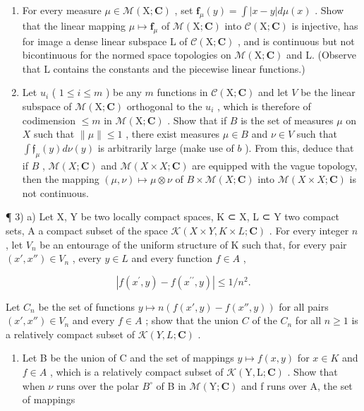 \begin{enumerate}
\def\labelenumi{\alph{enumi})}
\setcounter{enumi}{1}
\item
  For every measure \(\mu \in \mathcal{M}(\mathrm{X};\mathbf{C})\) , set \(\mathbf{f}_{\mu}(y) = \int |x - y| d\mu(x)\) . Show that the linear mapping \(\mu \mapsto \mathbf{f}_{\mu}\) of \(\mathcal{M}(\mathrm{X};\mathbf{C})\) into \(\mathcal{C}(\mathrm{X};\mathbf{C})\) is injective, has for image a dense linear subspace L of \(\mathcal{C}(\mathrm{X};\mathbf{C})\) , and is continuous but not bicontinuous for the normed space topologies on \(\mathcal{M}(\mathrm{X};\mathbf{C})\) and L. (Observe that L contains the constants and the piecewise linear functions.)
\item
  Let \(u_{i}\) ( \(1 \leqslant i \leqslant m\) ) be any \(m\) functions in \(\mathcal{C}(\mathrm{X};\mathbf{C})\) and let \(V\) be the linear subspace of \(\mathcal{M}(\mathrm{X};\mathbf{C})\) orthogonal to the \(u_{i}\) , which is therefore of codimension \(\leqslant m\) in \(\mathcal{M}(\mathrm{X};\mathbf{C})\) . Show that if \(B\) is the set of measures \(\mu\) on \(X\) such that \(\| \mu \| \leqslant 1\) , there exist measures \(\mu \in B\) and \(\nu \in V\) such that \(\int \mathfrak{f}_{\mu}(y)d\nu(y)\) is arbitrarily large (make use of \(b\) ). From this, deduce that if \(B\) , \(\mathcal{M}(X; \mathbf{C})\) and \(\mathcal{M}(X \times X; \mathbf{C})\) are equipped with the vague topology, then the mapping \((\mu, \nu) \mapsto \mu \otimes \nu\) of \(B \times \mathcal{M}(X; \mathbf{C})\) into \(\mathcal{M}(X \times X; \mathbf{C})\) is not continuous.
\end{enumerate}

¶ 3) a) Let X, Y be two locally compact spaces, K ⊂ X, L ⊂ Y two compact sets, A a compact subset of the space \(\mathcal{K}(X \times Y, K \times L; \mathbf{C})\) . For every integer \(n\) , let \(V_n\) be an entourage of the uniform structure of K such that, for every pair \((x', x'') \in V_n\) , every \(y \in L\) and every function \(f \in A\) ,

\[
\left| f (x ^ {\prime}, y) - f (x ^ {\prime \prime}, y) \right| \leqslant 1 / n ^ {2}.
\]

Let \(C_n\) be the set of functions \(y \mapsto n(f(x', y) - f(x'', y))\) for all pairs \((x', x'') \in V_n\) and every \(f \in A\) ; show that the union \(C\) of the \(C_n\) for all \(n \geqslant 1\) is a relatively compact subset of \(\mathcal{K}(Y, L; \mathbf{C})\) .

\begin{enumerate}
\def\labelenumi{\alph{enumi})}
\setcounter{enumi}{1}
\tightlist
\item
  Let B be the union of C and the set of mappings \(y \mapsto f(x, y)\) for \(x \in K\) and \(f \in A\) , which is a relatively compact subset of \(\mathcal{K}(\mathrm{Y}, \mathrm{L}; \mathbf{C})\) . Show that when \(\nu\) runs over the polar \(B^{\circ}\) of B in \(\mathcal{M}(\mathrm{Y}; \mathbf{C})\) and f runs over A, the set of mappings
\end{enumerate}

